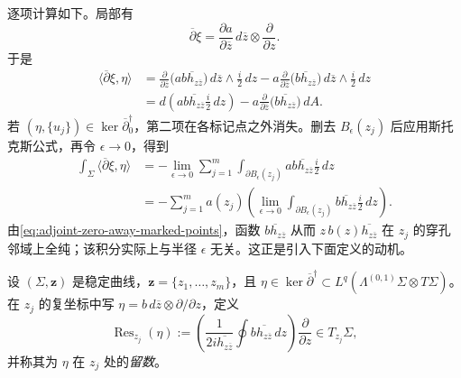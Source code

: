 逐项计算如下。局部有
\[
 \overline\partial\xi
 =\frac{\partial a}{\partial\overline z}
 \,d\overline z\otimes\frac\partial{\partial z}.
\]
于是
\[
 \begin{split}
 \langle\overline\partial\xi,\eta\rangle
 &=\frac\partial{\partial\overline z}
 \bigl(a\overline{b h_{z\overline z}}\bigr)
 \,d\overline z\wedge\frac i2\,dz
 -a\frac\partial{\partial\overline z}
 \bigl(\overline{b h_{z\overline z}}\bigr)
 \,d\overline z\wedge\frac i2\,dz\\
 &=d\!\left(a\overline{b h_{z\overline z}}\frac i2\,dz\right)
 -a\frac\partial{\partial\overline z}
 \bigl(\overline{b h_{z\overline z}}\bigr)\,dA.
 \end{split}
\]
若 $(\eta,\{u_j\})\in\ker\overline\partial_0^\dagger$，第二项在各标记点之外消失。删去
$B_\epsilon(z_j)$ 后应用斯托克斯公式，再令 $\epsilon\to0$，得到
\[
 \begin{split}
 \int_\Sigma\langle\overline\partial\xi,\eta\rangle
 &=-\lim_{\epsilon\to0}\sum_{j=1}^m
 \int_{\partial B_\epsilon(z_j)}
 a\overline{b h_{z\overline z}}\frac i2\,dz\\
 &=-\sum_{j=1}^ma(z_j)
 \left(\lim_{\epsilon\to0}
 \int_{\partial B_\epsilon(z_j)}
 \overline{b h_{z\overline z}}\frac i2\,dz\right).
 \end{split}
\]
由\eqref{eq:adjoint-zero-away-marked-points}，函数
$\overline{b h_{z\overline z}}$ 从而 $z\,b(z)\overline{h_{z\overline z}}$ 在
$z_j$ 的穿孔邻域上全纯；该积分实际上与半径 $\epsilon$ 无关。这正是引入下面定义的动机。

\begin{definition}\label{def:residue-deformation-form}
设 $(\Sigma,\boldsymbol z)$ 是稳定曲线，$\boldsymbol z=\{z_1,\ldots,z_m\}$，且
$\eta\in\ker\overline\partial^\dagger
\subset L^q(\Lambda^{(0,1)}\Sigma\otimes T\Sigma)$。在 $z_j$ 的复坐标中写
$\eta=b\,d\overline z\otimes\partial/\partial z$，定义
\[
 \operatorname{Res}_{z_j}(\eta)
 :=\left(\frac1{2i\overline{h_{z\overline z}}}
 \oint b\overline{h_{z\overline z}}\,dz\right)
 \frac\partial{\partial z}\in T_{z_j}\Sigma,
\]
并称其为 $\eta$ 在 $z_j$ 处的\emph{留数}。
\end{definition}

